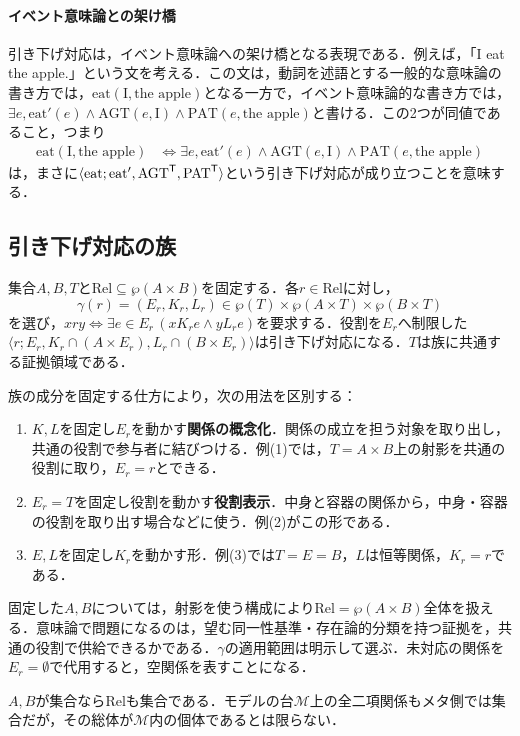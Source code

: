 \documentclass[../../main-detail.tex]{subfiles}
\begin{document}
\paragraph{イベント意味論との架け橋}
引き下げ対応は，イベント意味論への架け橋となる表現である．例えば，「I eat the apple.」という文を考える．この文は，動詞を述語とする一般的な意味論の書き方では，$\text{eat}(\text{I},\text{the apple})$となる一方で，イベント意味論的な書き方では，$\exists e, \text{eat}'(e)\land \text{AGT}(e,\text{I})\land \text{PAT}(e,\text{the apple})$と書ける．この2つが同値であること，つまり
\begin{align*}
    \text{eat}(\text{I},\text{the apple}) & \iff \exists e, \text{eat}'(e)\land \text{AGT}(e,\text{I})\land \text{PAT}(e,\text{the apple})
\end{align*}
は，まさに$
    \langle \text{eat}; \text{eat}', \text{AGT}^{\mathsf{T}}, \text{PAT}^{\mathsf{T}} \rangle
$という引き下げ対応が成り立つことを意味する．
\subsection{引き下げ対応の族}
\begin{definition}
    集合$A,B,T$と$\mathrm{Rel}\subseteq\wp(A\times B)$を固定する．各$r\in\mathrm{Rel}$に対し，
    \[
        \gamma(r)=(E_r,K_r,L_r)\in
        \wp(T)\times\wp(A\times T)\times\wp(B\times T)
    \]
    を選び，$xry\iff\exists e\in E_r\,(xK_re\land yL_re)$を要求する．役割を$E_r$へ制限した
    $\langle r;E_r,K_r\cap(A\times E_r),L_r\cap(B\times E_r)\rangle$は引き下げ対応になる．$T$は族に共通する証拠領域である．
\end{definition}
族の成分を固定する仕方により，次の用法を区別する：
\begin{enumerate}
    \item $K,L$を固定し$E_r$を動かす\textbf{関係の概念化}．関係の成立を担う対象を取り出し，共通の役割で参与者に結びつける．例(1)では，$T=A\times B$上の射影を共通の役割に取り，$E_r=r$とできる．
    \item $E_r=T$を固定し役割を動かす\textbf{役割表示}．中身と容器の関係から，中身・容器の役割を取り出す場合などに使う．例(2)がこの形である．
    \item $E,L$を固定し$K_r$を動かす形．例(3)では$T=E=B$，$L$は恒等関係，$K_r=r$である．
\end{enumerate}
\begin{remark}[族の適用範囲]
    固定した$A,B$については，射影を使う構成により$\mathrm{Rel}=\wp(A\times B)$全体を扱える．意味論で問題になるのは，望む同一性基準・存在論的分類を持つ証拠を，共通の役割で供給できるかである．$\gamma$の適用範囲は明示して選ぶ．未対応の関係を$E_r=\emptyset$で代用すると，空関係を表すことになる．

    $A,B$が集合なら$\mathrm{Rel}$も集合である．モデルの台$\mathcal M$上の全二項関係もメタ側では集合だが，その総体が$\mathcal M$内の個体であるとは限らない．
\end{remark}
\end{document}
